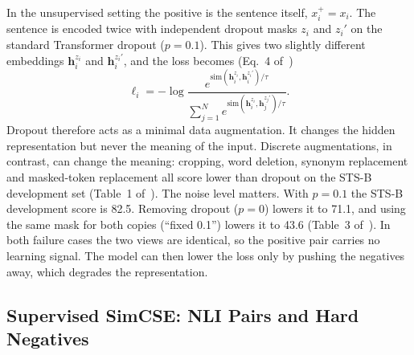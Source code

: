 In the unsupervised setting the positive is the sentence itself,
$x_i^+=x_i$. The sentence is encoded twice with independent dropout masks
$z_i$ and $z_i'$ on the standard Transformer dropout ($p=0.1$). This gives two
slightly different embeddings $\mathbf{h}_i^{z_i}$ and $\mathbf{h}_i^{z_i'}$,
and the loss becomes (Eq.~4 of~\cite{gao-etal-2021-simcse})
\begin{equation}
\ell_i = -\log
  \frac{e^{\mathrm{sim}(\mathbf{h}_i^{z_i},\mathbf{h}_i^{z_i'})/\tau}}
       {\sum_{j=1}^{N} e^{\mathrm{sim}(\mathbf{h}_i^{z_i},\mathbf{h}_j^{z_j'})/\tau}}.
\label{eq:unsup}
\end{equation}
Dropout therefore acts as a minimal data augmentation. It changes the hidden
representation but never the meaning of the input. Discrete augmentations, in
contrast, can change the meaning: cropping, word deletion, synonym replacement
and masked-token replacement all score lower than dropout on the STS-B
development set (Table~1 of~\cite{gao-etal-2021-simcse}). The noise level
matters. With $p=0.1$ the STS-B development score is 82.5. Removing dropout
($p=0$) lowers it to 71.1, and using the same mask for both copies
(``fixed 0.1'') lowers it to 43.6 (Table~3 of~\cite{gao-etal-2021-simcse}).
In both failure cases the two views are identical, so the positive pair carries
no learning signal. The model can then lower the loss only by pushing the
negatives away, which degrades the representation.

\subsection{Supervised SimCSE: NLI Pairs and Hard Negatives}
\label{sec:method-sup}

